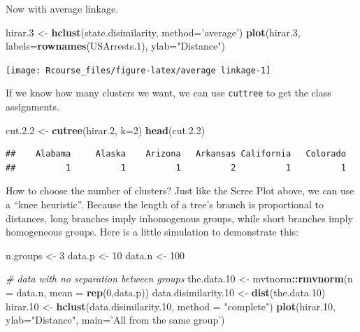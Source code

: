 \documentclass[]{book}
\newenvironment{Shaded}{\begin{snugshade}}{\end{snugshade}}
\newcommand{\KeywordTok}[1]{\textcolor[rgb]{0.13,0.29,0.53}{\textbf{#1}}}
\newcommand{\DataTypeTok}[1]{\textcolor[rgb]{0.13,0.29,0.53}{#1}}
\newcommand{\DecValTok}[1]{\textcolor[rgb]{0.00,0.00,0.81}{#1}}
\newcommand{\FloatTok}[1]{\textcolor[rgb]{0.00,0.00,0.81}{#1}}
\newcommand{\StringTok}[1]{\textcolor[rgb]{0.31,0.60,0.02}{#1}}
\newcommand{\CommentTok}[1]{\textcolor[rgb]{0.56,0.35,0.01}{\textit{#1}}}
\newcommand{\OperatorTok}[1]{\textcolor[rgb]{0.81,0.36,0.00}{\textbf{#1}}}
\newcommand{\NormalTok}[1]{#1}
\theoremstyle{definition}
\theoremstyle{definition}
\theoremstyle{definition}
\theoremstyle{remark}
\begin{document}
Now with average linkage.

\begin{Shaded}
\begin{Highlighting}[]
\NormalTok{hirar.}\DecValTok{3}\NormalTok{ <-}\StringTok{ }\KeywordTok{hclust}\NormalTok{(state.disimilarity, }\DataTypeTok{method=}\StringTok{'average'}\NormalTok{)}
\KeywordTok{plot}\NormalTok{(hirar.}\DecValTok{3}\NormalTok{, }\DataTypeTok{labels=}\KeywordTok{rownames}\NormalTok{(USArrests.}\DecValTok{1}\NormalTok{), }\DataTypeTok{ylab=}\StringTok{"Distance"}\NormalTok{)}
\end{Highlighting}
\end{Shaded}

\texttt{[image: Rcourse\_files/figure-latex/average linkage-1]}

If we know how many clusters we want, we can use \texttt{cuttree} to get
the class assignments.

\begin{Shaded}
\begin{Highlighting}[]
\NormalTok{cut.}\FloatTok{2.2}\NormalTok{ <-}\StringTok{ }\KeywordTok{cutree}\NormalTok{(hirar.}\DecValTok{2}\NormalTok{, }\DataTypeTok{k=}\DecValTok{2}\NormalTok{)}
\KeywordTok{head}\NormalTok{(cut.}\FloatTok{2.2}\NormalTok{)}
\end{Highlighting}
\end{Shaded}

\begin{verbatim}
##    Alabama     Alaska    Arizona   Arkansas California   Colorado 
##          1          1          1          2          1          1
\end{verbatim}

How to choose the number of clusters? Just like the Scree Plot above, we
can use a ``knee heuristic''. Because the length of a tree's branch is
proportional to distances, long branches imply inhomogenous groups,
while short branches imply homogeneous groups. Here is a little
simulation to demonstrate this:

\begin{Shaded}
\begin{Highlighting}[]
\NormalTok{n.groups <-}\StringTok{ }\DecValTok{3}
\NormalTok{data.p <-}\StringTok{ }\DecValTok{10}
\NormalTok{data.n <-}\StringTok{ }\DecValTok{100}

\CommentTok{# data with no separation between groups}
\NormalTok{the.data.}\DecValTok{10}\NormalTok{ <-}\StringTok{ }\NormalTok{mvtnorm}\OperatorTok{::}\KeywordTok{rmvnorm}\NormalTok{(}\DataTypeTok{n =}\NormalTok{ data.n, }\DataTypeTok{mean =} \KeywordTok{rep}\NormalTok{(}\DecValTok{0}\NormalTok{,data.p))  }
\NormalTok{data.disimilarity.}\DecValTok{10}\NormalTok{ <-}\StringTok{ }\KeywordTok{dist}\NormalTok{(the.data.}\DecValTok{10}\NormalTok{)}
\NormalTok{hirar.}\DecValTok{10}\NormalTok{ <-}\StringTok{ }\KeywordTok{hclust}\NormalTok{(data.disimilarity.}\DecValTok{10}\NormalTok{, }\DataTypeTok{method =} \StringTok{"complete"}\NormalTok{)}
\KeywordTok{plot}\NormalTok{(hirar.}\DecValTok{10}\NormalTok{, }\DataTypeTok{ylab=}\StringTok{"Distance"}\NormalTok{, }\DataTypeTok{main=}\StringTok{'All from the same group'}\NormalTok{)}
\end{Highlighting}
\end{Shaded}
\end{document}
